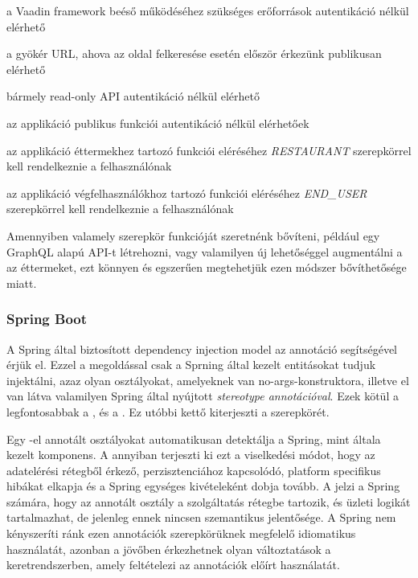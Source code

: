 \begin{listing}
	\item a Vaadin framework beéső működéséhez szükséges erőforrások autentikáció nélkül elérhető
	\item a gyökér URL, ahova az oldal felkeresése esetén először érkezünk publikusan elérhető
	\item bármely read-only API autentikáció nélkül elérhető
	\item az applikáció publikus funkciói autentikáció nélkül elérhetőek
	\item az applikáció éttermekhez tartozó funkciói eléréséhez \emph{RESTAURANT} szerepkörrel kell rendelkeznie a felhasználónak
	\item az applikáció végfelhasználókhoz tartozó funkciói eléréséhez \emph{END\_USER} szerepkörrel kell rendelkeznie a felhasználónak
\end{listing} \par

Amennyiben valamely szerepkör funkcióját szeretnénk bővíteni, például egy GraphQL alapú API-t létrehozni, vagy valamilyen új lehetőséggel augmentálni a az éttermeket, ezt könnyen és egszerűen megtehetjük ezen módszer bővíthetősége miatt. \par

\subsubsection{Spring Boot}

A Spring által biztosított dependency injection model az  annotáció segítségével érjük el. Ezzel a megoldással csak a Sprning által kezelt entitásokat tudjuk injektálni, azaz olyan osztályokat, amelyeknek van no-args-konstruktora, illetve el van látva valamilyen Spring által nyújtott \emph{stereotype annotációval}. Ezek kötül a legfontosabbak a ,  és a . Ez utóbbi kettő kiterjeszti a  szerepkörét. \par

Egy -el annotált osztályokat automatikusan detektálja a Spring, mint általa kezelt komponens. A  annyiban terjeszti ki ezt a viselkedési módot, hogy az adatelérési rétegből érkező, perzisztenciához kapcsolódó, platform specifikus hibákat elkapja és a Spring egységes kivételeként dobja tovább. A  jelzi a Spring számára, hogy az annotált osztály a szolgáltatás rétegbe tartozik, és üzleti logikát tartalmazhat, de jelenleg ennek nincsen szemantikus jelentősége. A Spring nem kényszeríti ránk ezen annotációk szerepkörüknek megfelelő idiomatikus használatát, azonban a jövőben érkezhetnek olyan változtatások a keretrendszerben, amely feltételezi az annotációk előírt használatát. \par

